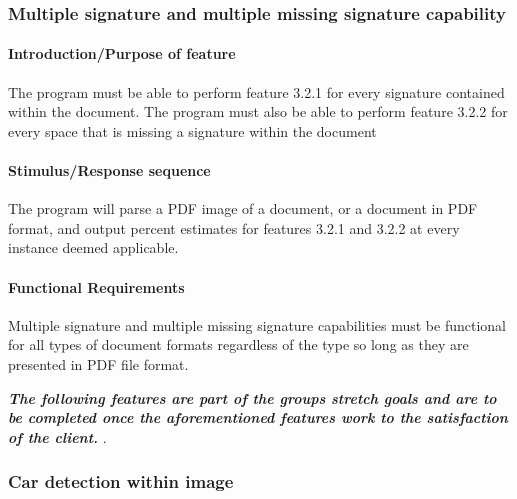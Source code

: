 \documentclass[onecolumn, draftclsnofoot,10pt, compsoc]{IEEEtran}
\begin{document}
\subsubsection{Multiple signature and multiple missing signature capability}\vspace{.5cm}

\hfill\begin{minipage}{\dimexpr\textwidth-2cm}
\paragraph{Introduction/Purpose of feature}
The program must be able to perform feature 3.2.1 for every signature contained within the document. The program must also be able to perform feature 3.2.2 for every space that is missing a signature within the document
\paragraph{Stimulus/Response sequence}
The program will parse a PDF image of a document, or a document in PDF format, and output percent estimates for features 3.2.1 and 3.2.2 at every instance deemed applicable. 
\paragraph{Functional Requirements}
Multiple signature and multiple missing signature capabilities must be functional for all types of document formats regardless of the type so long as they are presented in PDF file format.
\end{minipage}

\vspace{.75cm}
\textbf{\textit{The following features are part of the groups stretch goals and are to be completed once the aforementioned features work to the satisfaction of the client. 
}}.
\vspace{.75cm}


\subsubsection{Car detection within image}\vspace{.5cm}
\end{document}
